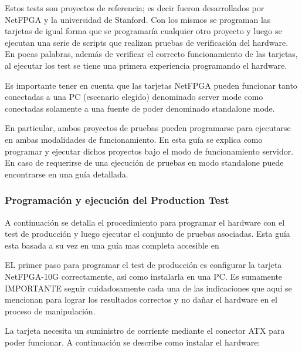 Estos tests son proyectos de referencia; es decir fueron desarrollados por NetFPGA y la universidad de Stanford. Con los mismos se programan las tarjetas de igual forma que se programaría cualquier otro proyecto y luego se ejecutan una serie de scripts que realizan pruebas de verificación del hardware. En pocas palabras, además de verificar el correcto funcionamiento de las tarjetas, al ejecutar los test se tiene una primera experiencia programando el hardware.

Es importante tener en cuenta que las tarjetas NetFPGA pueden funcionar tanto conectadas a una PC 
 (escenario elegido) denominado server mode como conectadas solamente a una fuente de poder denominado standalone mode.

En particular, ambos proyectos de pruebas pueden programarse para ejecutarse en ambas modalidades de funcionamiento. En esta guía se explica como programar y ejecutar dichos proyectos bajo el modo de funcionamiento servidor. En caso de requerirse de una ejecuci\'on de pruebas en modo standalone puede encontrarse en\citep{NetFPGA6}\citep{NetFPGA8} una guía detallada.

\subsubsection{Programación y ejecución del Production Test}
A continuación se detalla el procedimiento para programar el hardware con el test de producción y luego ejecutar el conjunto de pruebas asociadas. Esta guía esta basada a su vez en una guía mas completa accesible en\citep{NetFPGA6}

EL primer paso para programar el test de producción es configurar la tarjeta NetFPGA-10G correctamente, así como instalarla en una PC. Es sumamente IMPORTANTE seguir cuidadosamente cada una de las indicaciones que aquí se mencionan para lograr los resultados correctos y no dañar el hardware en el proceso de manipulación.

La tarjeta necesita un suministro de corriente mediante el conector ATX para poder funcionar. A continuación se describe como instalar el hardware:

